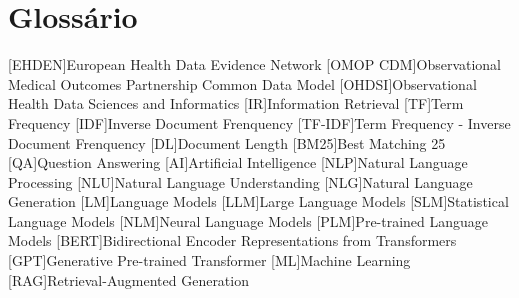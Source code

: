 \chapter{Glossário}

\footnotesize
\SingleSpacing

\begin{multicols}{2}
\begin{acronym}[AAAAAA]

	[EHDEN]{European Health Data Evidence Network}
	[OMOP CDM]{Observational Medical Outcomes Partnership Common Data Model}
	[OHDSI]{Observational Health Data Sciences and Informatics}
	[IR]{Information Retrieval}
	[TF]{Term Frequency}
	[IDF]{Inverse Document Frenquency}
	[TF-IDF]{Term Frequency - Inverse Document Frenquency}
	[DL]{Document Length}
	[BM25]{Best Matching 25}
	[QA]{Question Answering}
	[AI]{Artificial Intelligence}
	[NLP]{Natural Language Processing}
	[NLU]{Natural Language Understanding}
	[NLG]{Natural Language Generation}
	[LM]{Language Models}
	[LLM]{Large Language Models}
	[SLM]{Statistical Language Models}
	[NLM]{Neural Language Models}
	[PLM]{Pre-trained Language Models}
	[BERT]{Bidirectional Encoder Representations from Transformers}
	[GPT]{Generative Pre-trained Transformer}
	[ML]{Machine Learning}
	[RAG]{Retrieval-Augmented Generation}

\end{acronym}
\end{multicols}


